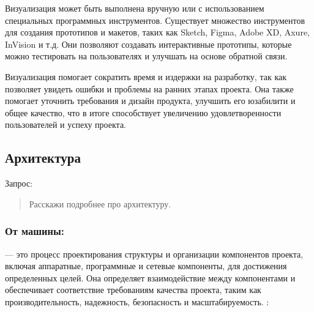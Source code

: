 \documentclass[letterpaper,10pt,russian]{sphinxmanual}
\begin{document}
\sphinxAtStartPar
Визуализация может быть выполнена вручную или с использованием специальных программных инструментов. Существует множество инструментов для создания прототипов и макетов, таких как Sketch, Figma, Adobe XD, Axure, InVision и т.д. Они позволяют создавать интерактивные прототипы, которые можно тестировать на пользователях и улучшать на основе обратной связи.

\sphinxAtStartPar
Визуализация помогает сократить время и издержки на разработку, так как позволяет увидеть ошибки и проблемы на ранних этапах проекта. Она также помогает уточнить требования и дизайн продукта, улучшить его юзабилити и общее качество, что в итоге способствует увеличению удовлетворенности пользователей и успеху проекта.


\subsection{Архитектура}
\label{\detokenize{educational_materials/stages/content:id9}}
\sphinxAtStartPar
Запрос:
\begin{quote}

\sphinxAtStartPar
Расскажи подробнее про архитектуру.
\end{quote}


\subsubsection{От машины:}
\label{\detokenize{educational_materials/stages/content:id10}}
\sphinxAtStartPar
{} — это процесс проектирования структуры и организации компонентов проекта, включая аппаратные, программные и сетевые компоненты, для достижения определенных целей. Она определяет взаимодействие между компонентами и обеспечивает соответствие требованиям качества проекта, таким как производительность, надежность, безопасность и масштабируемость. : 
\end{document}
